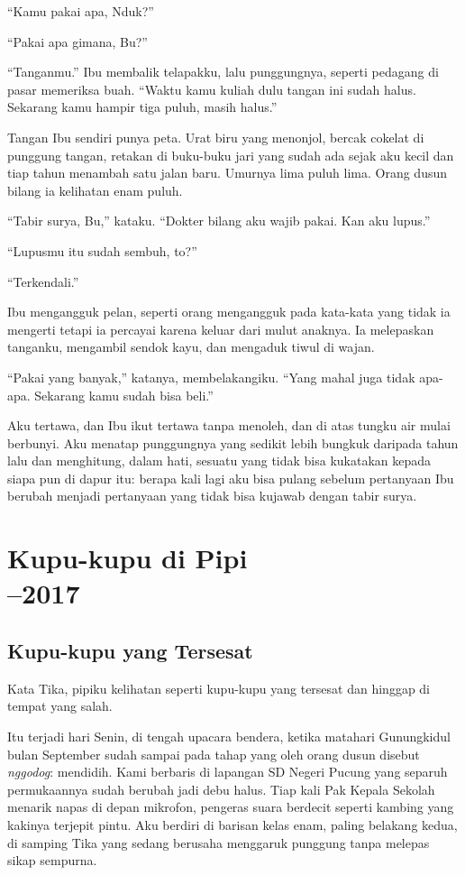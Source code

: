 \documentclass[11pt,twoside,openany]{book}
\begin{document}
``Kamu pakai apa, Nduk?''

``Pakai apa gimana, Bu?''

``Tanganmu.'' Ibu membalik telapakku, lalu punggungnya, seperti pedagang di pasar memeriksa buah. ``Waktu kamu kuliah dulu tangan ini sudah halus. Sekarang kamu hampir tiga puluh, masih halus.''

Tangan Ibu sendiri punya peta. Urat biru yang menonjol, bercak cokelat di punggung tangan, retakan di buku-buku jari yang sudah ada sejak aku kecil dan tiap tahun menambah satu jalan baru. Umurnya lima puluh lima. Orang dusun bilang ia kelihatan enam puluh.

``Tabir surya, Bu,'' kataku. ``Dokter bilang aku wajib pakai. Kan aku lupus.''

``Lupusmu itu sudah sembuh, to?''

``Terkendali.''

Ibu mengangguk pelan, seperti orang mengangguk pada kata-kata yang tidak ia mengerti tetapi ia percayai karena keluar dari mulut anaknya. Ia melepaskan tanganku, mengambil sendok kayu, dan mengaduk tiwul di wajan.

``Pakai yang banyak,'' katanya, membelakangiku. ``Yang mahal juga tidak apa-apa. Sekarang kamu sudah bisa beli.''

Aku tertawa, dan Ibu ikut tertawa tanpa menoleh, dan di atas tungku air mulai berbunyi. Aku menatap punggungnya yang sedikit lebih bungkuk daripada tahun lalu dan menghitung, dalam hati, sesuatu yang tidak bisa kukatakan kepada siapa pun di dapur itu: berapa kali lagi aku bisa pulang sebelum pertanyaan Ibu berubah menjadi pertanyaan yang tidak bisa kujawab dengan tabir surya.

\part[Kupu-kupu di Pipi]{Kupu-kupu di Pipi\\[0.7em]\normalsize{}--2017}
\chapter{Kupu-kupu yang Tersesat}
Kata Tika, pipiku kelihatan seperti kupu-kupu yang tersesat dan hinggap di tempat yang salah.

Itu terjadi hari Senin, di tengah upacara bendera, ketika matahari Gunungkidul bulan September sudah sampai pada tahap yang oleh orang dusun disebut \emph{nggodog}: mendidih. Kami berbaris di lapangan SD Negeri Pucung yang separuh permukaannya sudah berubah jadi debu halus. Tiap kali Pak Kepala Sekolah menarik napas di depan mikrofon, pengeras suara berdecit seperti kambing yang kakinya terjepit pintu. Aku berdiri di barisan kelas enam, paling belakang kedua, di samping Tika yang sedang berusaha menggaruk punggung tanpa melepas sikap sempurna.
\end{document}
